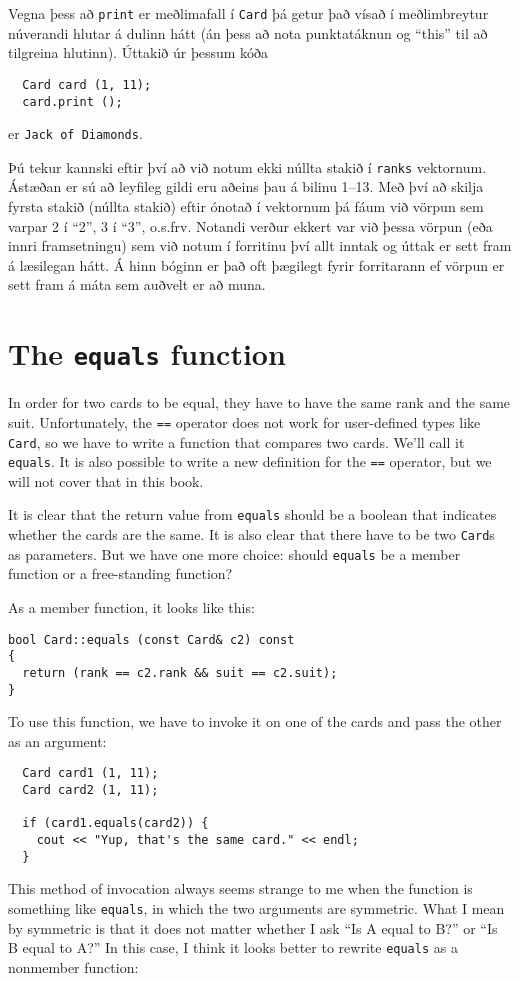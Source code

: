 Vegna þess að {\tt print} er meðlimafall í {\tt Card} þá getur það vísað í meðlimbreytur núverandi hlutar á dulinn hátt (án þess að nota punktatáknun og ``this'' til að tilgreina hlutinn).
Úttakið úr þessum kóða

\begin{verbatim}
  Card card (1, 11);
  card.print ();
\end{verbatim}
%
er {\tt Jack of Diamonds}.

Þú tekur kannski eftir því að við notum ekki núllta stakið í {\tt ranks} vektornum.
Ástæðan er sú að leyfileg gildi eru aðeins þau á bilinu 1--13.
Með því að skilja fyrsta stakið (núllta stakið) eftir ónotað í vektornum þá fáum við vörpun sem varpar 2 í ``2'', 3 í ``3'', o.s.frv.
Notandi verður ekkert var við þessa vörpun (eða innri framsetningu) sem við notum í forritinu því allt inntak og úttak er sett fram á læsilegan hátt.
Á hinn bóginn er það oft þægilegt fyrir forritarann ef vörpun er sett fram á máta sem auðvelt er að muna.

\section{The {\tt equals} function}

In order for two cards to be equal, they have to have the same rank
and the same suit.  Unfortunately, the {\tt ==} operator does not work
for user-defined types like {\tt Card}, so we have to write a function
that compares two cards.  We'll call it {\tt equals}.  It is also
possible to write a new definition for the {\tt ==} operator, but we
will not cover that in this book.

It is clear that the return value from {\tt equals} should be a
boolean that indicates whether the cards are the same.  It is
also clear that there have to be two {\tt Card}s as parameters.
But we have one more choice: should {\tt equals} be a member
function or a free-standing function?

As a member function, it looks like this:

\begin{verbatim}
bool Card::equals (const Card& c2) const
{
  return (rank == c2.rank && suit == c2.suit);
}
\end{verbatim}
%
To use this function, we have to invoke it on one of the
cards and pass the other as an argument:

\begin{verbatim}
  Card card1 (1, 11);
  Card card2 (1, 11);

  if (card1.equals(card2)) {
    cout << "Yup, that's the same card." << endl;
  }
\end{verbatim}
%
This method of invocation always seems strange to me when the
function is something like {\tt equals}, in which the two
arguments are symmetric.  What I mean by symmetric is that it
does not matter whether I ask ``Is A equal to B?'' or
``Is B equal to A?''  In this case, I think it looks better to rewrite
{\tt equals} as a nonmember function:

